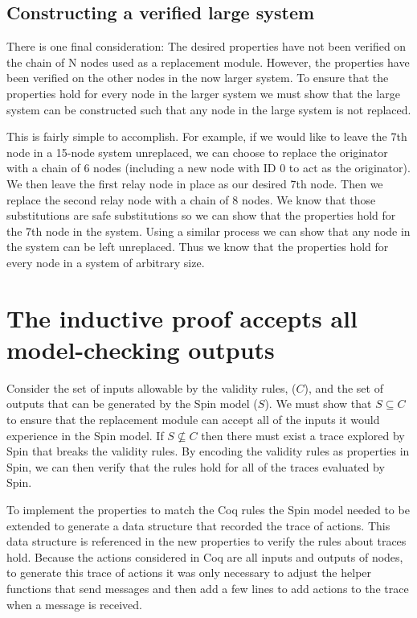 \documentclass[runningheads]{llncs}
\begin{document}
\subsection{Constructing a verified large system}
There is one final consideration: The desired properties have not been verified on the chain of N nodes used as a replacement module. However, the properties have been verified on the other nodes in the now larger system. To ensure that the properties hold for every node in the larger system we must show that the large system can be constructed such that any node in the large system is not replaced. 

This is fairly simple to accomplish. For example, if we would like to leave the 7th node in a 15-node system unreplaced, we can choose to replace the originator with a chain of 6 nodes (including a new node with ID 0 to act as the originator). We then leave the first relay node in place as our desired 7th node. Then we replace the second relay node with a chain of 8 nodes. We know that those substitutions are safe substitutions so we can show that the properties hold for the 7th node in the system. Using a similar process we can show that any node in the system can be left unreplaced. Thus we know that the properties hold for every node in a system of arbitrary size. 

\section{The inductive proof accepts all model-checking outputs}
\label{sec:inputs_smaller}
Consider the set of inputs allowable by the validity rules, ($C$), and the set of outputs that can be generated by the Spin model ($S$). We must show that $S \subseteq C$ to ensure that the replacement module can accept all of the inputs it would experience in the Spin model. If $S \nsubseteq C$ then there must exist a trace explored by Spin that breaks the validity rules. By encoding the validity rules as properties in Spin, we can then verify that the rules hold for all of the traces evaluated by Spin. 

To implement the properties to match the Coq rules the Spin model needed to be extended to generate a data structure that recorded the trace of actions. This data structure is referenced in the new properties to verify the rules about traces hold. Because the actions considered in Coq are all inputs and outputs of nodes, to generate this trace of actions it was only necessary to adjust the helper functions that send messages and then add a few lines to add actions to the trace when a message is received. 
\end{document}
